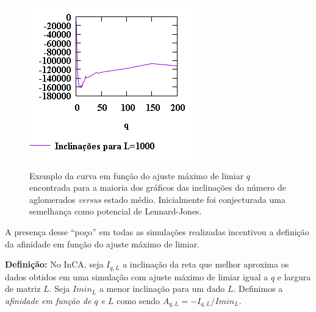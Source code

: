 \documentclass[11pt,a4paper,twocolumn,final]{article}
\begin{document}
\begin{figure}
    \centering
    \includegraphics[width=.9\linewidth]{DadosSlopeL1000.png}
    \caption{Exemplo da curva  em função do ajuste máximo de limiar $q$ encontrada para a maioria dos gráficos das inclinações do número de aglomerados \textit{versus} estado médio. Inicialmente foi conjecturada uma semelhança como potencial de Lennard-Jones.}
    \label{fig:DadosSlopeL1000}
\end{figure}
A presença desse ``poço'' em todas as simulações realizadas incentivou a definição da afinidade em função do ajuste máximo de limiar.

\textbf{Definição:} No InCA, seja $I_{q,L}$ a inclinação da reta que melhor aproxima os dados obtidos em uma simulação com ajuste máximo de limiar igual a $q$ e largura de matriz $L$. Seja $Imin_L$ a menor inclinação para um dado $L$. Definimos a \textit{afinidade em função de $q$ e $L$} como sendo $A_{q,L}=-I_{q,L}/Imin_L$.
\end{document}
